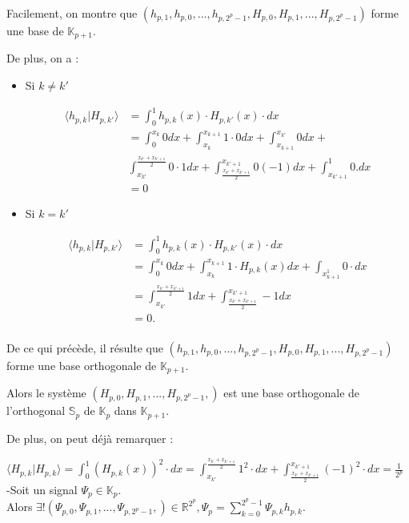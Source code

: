 \documentclass{article}
\begin{document}
Facilement, on montre que $(h_{p,1},h_{p,0},...,h_{p,2^p - 1},H_{p,0},H_{p,1},...,H_{p,2^p - 1})$ forme une base de $\mathbb{K}_{p+1}$.

De plus, on a :

\begin{itemize}

\item Si $k \neq k'$

\begin{align*}
\langle h_{p,k}|H_{p,k'} \rangle &= \int_{0}^1 h_{p,k}(x)\cdot{}H_{p,k'}(x)\cdot{dx} \\ 
&= \int_{0}^{x_k} 0 dx + \int_{x_k}^{x_{k+1}} 1\cdot{}0dx + \int_{x_{k+1}}^{x_{k'}} 0dx + \\
 &\int_{x_{k'}}^{\frac{x_{k'} + x_{k'+1} }{2}} 0\cdot{}1dx + \int_{\frac{x_{k'} + x_{k'+1} }{2}}^{x_{k'+1}} 0(-1)dx + \int_{x_{k'+1}}^{1} 0.dx \\
&= 0
\end{align*} 
\item Si $k =k'$

\begin{align*}
 \langle h_{p,k}|H_{p,k'} \rangle &= \int_{0}^1 h_{p,k}(x)\cdot{}H_{p,k'}(x)\cdot{dx} \\
&= \int_{0}^{x_k} 0dx + \int_{x_k}^{x_{k+1}} 1\cdot{}H_{p,k}(x)dx + \int_{x_{k+1}^1} 0\cdot{}dx \\
&= \int_{x_{k'}}^{\frac{x_{k'} + x_{k'+1} }{2}} 1dx + \int_{\frac{x_{k'} + x_{k'+1} }{2}}^{x_{k'+1}} -1dx \\
&= 0 . \\
\end{align*}
\end{itemize}

De ce qui précède, il résulte que $(h_{p,1},h_{p,0},...,h_{p,2^p - 1},H_{p,0},H_{p,1},...,H_{p,2^p - 1})$ forme une base orthogonale de $\mathbb{K}_{p+1}$.

Alors le système $(H_{p,0}, H_{p,1},..., H_{p,2^p - 1},)$ est une base orthogonale de l'orthogonal $\mathbb{S}_{p}$ de $\mathbb{K}_{p}$ dans $\mathbb{K}_{p+1}$.

De plus, on peut déjà remarquer :

$\displaystyle \langle H_{p,k}|H_{p,k} \rangle = \int_0^1 (H_{p,k}(x))^{2}\cdot{}dx = \int_{x_{k'}}^{\frac{x_{k'} + x_{k'+1} }{2}} 1^{2}\cdot{}dx + \int_{\frac{x_{k'} + x_{k'+1} }{2}}^{x_{k'+1}} (-1)^{2}\cdot{}dx = \frac{1}{2^p} $ \\


-Soit un signal $\Psi{}_{p} \in \mathbb{K}_{p}$. \\ Alors $\displaystyle \exists{}! (\Psi{}_{p,0},\Psi{}_{p,1},...,\Psi{}_{p,2^p - 1},) \in \mathbb{R}^{2^p}, \Psi{}_{p} = \sum_{k=0}^{2^p - 1} \Psi{}_{p,k}h_{p,k}$.
\end{document}
